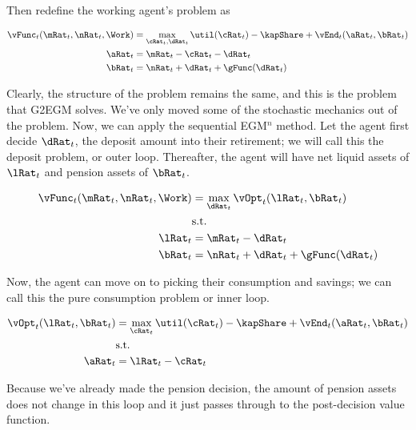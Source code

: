 \documentclass[\econtexRoot/SequentialEGM]{subfiles}
\begin{document}
Then redefine the working agent's problem as

\begin{equation}
	\begin{split}
		\vFunc_{t}(\mRat_{t}, \nRat_{t}, \Work) & = \max_{\cRat_{t},
			\dRat_{t}} \util(\cRat_{t})  - \kapShare + \vEnd_{t}(\aRat_{t},
		\bRat_{t}) \\
		\aRat_{t} & = \mRat_{t} - \cRat_{t} - \dRat_{t} \\
		\bRat_{t} & = \nRat_{t} + \dRat_{t} + \gFunc(\dRat_{t}) \\
	\end{split}
\end{equation}

Clearly, the structure of the problem remains the same, and this is the problem
that G2EGM solves. We've only moved some
of the stochastic mechanics out of the problem. Now, we can apply the
sequential EGM$^n$ method. Let the agent first decide $\dRat_{t}$, the deposit
amount into their retirement; we will call this the deposit problem, or outer loop. Thereafter, the
agent will have net liquid assets
of $\lRat_{t}$ and pension assets of $\bRat_{t}$.

\begin{equation}
	\begin{split}
		\vFunc_{t}(\mRat_{t}, \nRat_{t}, \Work) & = \max_{\dRat_{t}}
		\vOpt_{t}(\lRat_{t}, \bRat_{t}) \\
		& \text{s.t.} \\
		\lRat_{t} & = \mRat_{t} - \dRat_{t} \\
		\bRat_{t} & = \nRat_{t} + \dRat_{t} + \gFunc(\dRat_{t})
	\end{split}
\end{equation}

Now, the agent can move on to picking their consumption and savings; we can call this
the pure consumption problem or inner loop.

\begin{equation}
	\begin{split}
		\vOpt_{t}(\lRat_{t}, \bRat_{t}) & = \max_{\cRat_{t}}
		\util(\cRat_{t}) - \kapShare  + \vEnd_{t}(\aRat_{t}, \bRat_{t}) \\
		& \text{s.t.} \\
		\aRat_{t} & = \lRat_{t} - \cRat_{t} \\
	\end{split}
\end{equation}

Because we've already made the pension decision, the amount of pension assets
does not change in this loop and it just passes through to the post-decision
value function.
\end{document}
